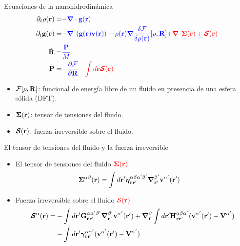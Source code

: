 \documentclass{beamer}
\newcommand{\esc}{\!\cdot\!}
\begin{document}
\begin{frame}{Ecuaciones de la nanohidrodinámica}
\begin{align}
  \partial_t\rho({\bf r})=&{\color{blue} -\boldsymbol{\nabla}\cdot{\bf g}({\bf r})}
\nonumber\\
\partial_t{\bf g}({\bf r})=&{\color{blue} -\boldsymbol{\nabla}\esc{\left({\bf g}({\bf r}){\bf v}({\bf r})\right)}
-\rho({\bf r})\boldsymbol{\nabla}\frac{\delta {\cal F}}{\delta\rho({\bf r})}[\rho,{\bf R}]}
{\color{red} +\boldsymbol{\nabla}\esc\boldsymbol{\Sigma}({\bf r})+\boldsymbol{{\cal S}}({\bf r})}
\nonumber\\
\dot{\bf R}=&{\color{blue} \frac{\bf P}{M}}
\nonumber\\
\dot{\bf P}=&{\color{blue} -\frac{\partial {\cal F}}{\partial {\bf R}}}
{\color{red} -\int d {{\bf r}}\boldsymbol{{\cal S}}({\bf r})}
\nonumber
\end{align}

\begin{itemize}
  \item ${\cal F}[\rho, {\bf R}]$: funcional de energía libre de un fluido en presencia de una esfera sólida (DFT).
  \item $\boldsymbol{\Sigma}({\bf r})$: tensor de tensiones del fluido. 
  \item $\boldsymbol{{\cal S}}({\bf r})$: fuerza irreversible sobre el fluido. 
\end{itemize}
\end{frame}

\begin{frame}{El tensor de tensiones del fluido y la fuerza irreversible}
  \begin{itemize}
    \item<1-> El tensor de tensiones del fluido ${\color{red} \boldsymbol{\Sigma}({\bf r})}$ 
  \begin{align}
  \boldsymbol{\Sigma}^{\alpha\beta}({\bf r})&=
\int d{\bf r}'
\boldsymbol{\eta}^{\alpha\beta\alpha'\beta'}_{{\bf r}{\bf r}'}
\boldsymbol{\nabla}_{{\bf r}'}^{\beta'}{\bf v}^{\alpha'}({\bf r}')
\nonumber
\end{align}
\item<2-> Fuerza irreversible sobre el fluido ${\color{red} {\cal S}({\bf r})}$
\begin{align}
  \boldsymbol{{\cal S}}^\alpha({\bf r})=&
-\int d{\bf r}'{\bf G}^{\alpha\alpha'\beta'}_{{\bf r}{\bf r}'}
\boldsymbol{\nabla}_{{\bf r}'}^{\beta'} {\bf v}^{\alpha'}({\bf r}')
+\boldsymbol{\nabla}_{{\bf r}}^{\beta}\int d{\bf r}'{\bf H}^{\alpha\beta\alpha'}_{{\bf r}{\bf r}'}
( {\bf v}^{\alpha'}({\bf r}')-{\bf V}^{\alpha'})
\nonumber\\
&-\int d{\bf r}'
\boldsymbol{\gamma}^{\alpha\alpha'}_{{\bf r}{\bf r}'}( {\bf v}^{\alpha'}({\bf r}')
-{\bf V}^{\alpha'})
\nonumber
\end{align}
\end{itemize}
\end{frame}
\end{document}
